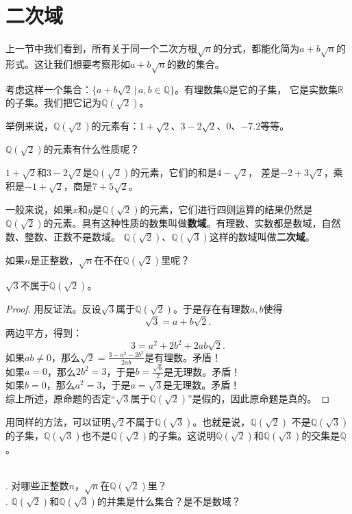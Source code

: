 \documentclass[12pt,UTF8]{ctexbook}
\begin{document}
\section{二次域}
上一节中我们看到，所有关于同一个二次方根$\sqrt{n}$的分式，都能化简为$a + b\sqrt{n}$的形式。这让我们想要考察形如$a + b\sqrt{n}$的数的集合。

考虑这样一个集合：$\{a + b\sqrt{2} \, | \, a, b \in\mathbb{Q}\}$。有理数集$\mathbb{Q}$是它的子集，
它是实数集$\mathbb{R}$的子集。我们把它记为$\mathbb{Q}(\sqrt{2})$。

举例来说，$\mathbb{Q}(\sqrt{2})$的元素有：$1 + \sqrt{2}$、$3 - 2\sqrt{2}$、$0$、$-7.2$等等。

$\mathbb{Q}(\sqrt{2})$的元素有什么性质呢？

$1 + \sqrt{2}$和$3 - 2\sqrt{2}$是$\mathbb{Q}(\sqrt{2})$的元素，它们的和是$4 - \sqrt{2}$，
差是$-2 + 3\sqrt{2}$，乘积是$-1 + \sqrt{2}$，商是$7 + 5\sqrt{2}$。

一般来说，如果$x$和$y$是$\mathbb{Q}(\sqrt{2})$的元素，它们进行四则运算的结果仍然是$\mathbb{Q}(\sqrt{2})$的元素。具有这种性质的数集叫做\textbf{数域}。有理数、实数都是数域，自然数、整数、正数不是数域。
$\mathbb{Q}(\sqrt{2})$、$\mathbb{Q}(\sqrt{3})$这样的数域叫做\textbf{二次域}。

如果$n$是正整数，$\sqrt{n}$在不在$\mathbb{Q}(\sqrt{2})$里呢？
\begin{tm}
    $\sqrt{3}$不属于$\mathbb{Q}(\sqrt{2})$。
\end{tm}\label{tm:3-1-0}
\begin{proof}
    用反证法。反设$\sqrt{3}$属于$\mathbb{Q}(\sqrt{2})$。于是存在有理数$a,b$使得
    $$ \sqrt{3} = a + b\sqrt{2}.$$
    两边平方，得到：
    $$ 3 = a^2 + 2b^2 + 2ab\sqrt{2}.$$
    如果$ab \neq 0$，那么$ \sqrt{2} = \frac{3 - a^2 - 2b^2}{2ab}$是有理数。矛盾！\\
    如果$a = 0$，那么$2b^2 = 3$，于是$b = \frac{\sqrt{6}}{2}$是无理数。矛盾！\\
    如果$b = 0$，那么$a^2 = 3$，于是$a = \sqrt{3}$是无理数。矛盾！\\
    综上所述，原命题的否定“$\sqrt{3}$属于$\mathbb{Q}(\sqrt{2})$”是假的，因此原命题是真的。
\end{proof}

用同样的方法，可以证明$\sqrt{2}$不属于$\mathbb{Q}(\sqrt{3})$。也就是说，$\mathbb{Q}(\sqrt{2})$
不是$\mathbb{Q}(\sqrt{3})$的子集，$\mathbb{Q}(\sqrt{3})$也不是$\mathbb{Q}(\sqrt{2})$的子集。这说明$\mathbb{Q}(\sqrt{2})$和$\mathbb{Q}(\sqrt{3})$的交集是$\mathbb{Q}$。

\begin{sk}\label{sk:3-2-0}
    \mbox{}\\
    . 对哪些正整数$n$，$\sqrt{n}$在$\mathbb{Q}(\sqrt{2})$里？\\
    . $\mathbb{Q}(\sqrt{2})$和$\mathbb{Q}(\sqrt{3})$的并集是什么集合？是不是数域？
\end{sk}
\end{document}
